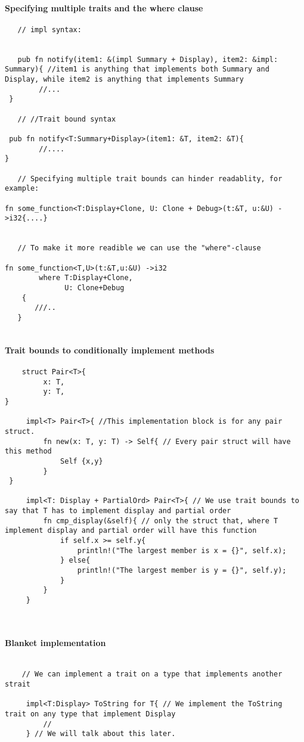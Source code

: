 \paragraph*{Specifying multiple traits and the where clause}\begin{lstlisting}  
   // impl syntax:
   
   
   pub fn notify(item1: &(impl Summary + Display), item2: &impl: Summary){ //item1 is anything that implements both Summary and Display, while item2 is anything that implements Summary
        //...
 }
   
   // //Trait bound syntax
   
 pub fn notify<T:Summary+Display>(item1: &T, item2: &T){
        //....
}
   
   // Specifying multiple trait bounds can hinder readablity, for example:
   
fn some_function<T:Display+Clone, U: Clone + Debug>(t:&T, u:&U) ->i32{....}
   
   
   // To make it more readible we can use the "where"-clause
   
fn some_function<T,U>(t:&T,u:&U) ->i32
        where T:Display+Clone,
              U: Clone+Debug
    {
       ///..
   }
   
\end{lstlisting}

\paragraph*{Trait bounds to conditionally implement methods}\begin{lstlisting}
    struct Pair<T>{
         x: T,
         y: T,
}
    
     impl<T> Pair<T>{ //This implementation block is for any pair struct.
         fn new(x: T, y: T) -> Self{ // Every pair struct will have this method
             Self {x,y}
         }
 }
    
     impl<T: Display + PartialOrd> Pair<T>{ // We use trait bounds to say that T has to implement display and partial order
         fn cmp_display(&self){ // only the struct that, where T implement display and partial order will have this function
             if self.x >= self.y{
                 println!("The largest member is x = {}", self.x);
             } else{
                 println!("The largest member is y = {}", self.y);
             }
         }
     }
    
    
\end{lstlisting}    
\paragraph*{Blanket implementation}\begin{lstlisting}
    
    // We can implement a trait on a type that implements another strait
    
     impl<T:Display> ToString for T{ // We implement the ToString trait on any type that implement Display
         //
     } // We will talk about this later.
\end{lstlisting}
